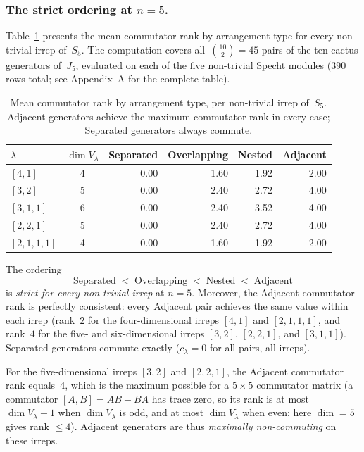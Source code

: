 \subsubsection{The strict ordering at $n = 5$.}

Table~\ref{tab:n5-commutator-rank} presents the mean commutator rank
by arrangement type for every non-trivial irrep of~$S_5$.  The
computation covers all~$\binom{10}{2} = 45$ pairs of the ten cactus
generators of~$J_5$, evaluated on each of the five non-trivial Specht
modules (390 rows total; see Appendix~A for the complete table).

\begin{table}[t]
\centering
\caption{Mean commutator rank by arrangement type, per non-trivial
irrep of~$S_5$.  Adjacent generators achieve the maximum commutator
rank in every case; Separated generators always commute.}
\label{tab:n5-commutator-rank}
\smallskip
\begin{tabular}{lcrrrr}
\hline
$\lambda$ & $\dim V_\lambda$ & Separated & Overlapping & Nested & Adjacent \\
\hline
$[4,1]$     & 4 & 0.00 & 1.60 & 1.92 & 2.00 \\
$[3,2]$     & 5 & 0.00 & 2.40 & 2.72 & 4.00 \\
$[3,1,1]$   & 6 & 0.00 & 2.40 & 3.52 & 4.00 \\
$[2,2,1]$   & 5 & 0.00 & 2.40 & 2.72 & 4.00 \\
$[2,1,1,1]$ & 4 & 0.00 & 1.60 & 1.92 & 2.00 \\
\hline
\end{tabular}
\end{table}

\noindent
The ordering
\begin{equation}
\label{eq:strict-ordering}
  \text{Separated} \;<\; \text{Overlapping} \;<\; \text{Nested} \;<\; \text{Adjacent}
\end{equation}
is \emph{strict for every non-trivial irrep} at $n = 5$.  Moreover,
the Adjacent commutator rank is perfectly consistent: every Adjacent
pair achieves the same value within each irrep (rank~$2$ for the
four-dimensional irreps $[4,1]$ and $[2,1,1,1]$, and rank~$4$ for the
five- and six-dimensional irreps $[3,2]$, $[2,2,1]$, and $[3,1,1]$).
Separated generators commute exactly ($c_\lambda = 0$ for all pairs,
all irreps).

\begin{remark}
For the five-dimensional irreps $[3,2]$ and $[2,2,1]$, the Adjacent
commutator rank equals~$4$, which is the maximum possible for a
$5 \times 5$ commutator matrix (a commutator $[A,B] = AB - BA$ has
trace zero, so its rank is at most $\dim V_\lambda - 1$ when
$\dim V_\lambda$ is odd, and at most $\dim V_\lambda$ when even; here
$\dim = 5$ gives rank $\leq 4$).  Adjacent generators are thus
\emph{maximally non-commuting} on these irreps.
\end{remark}

